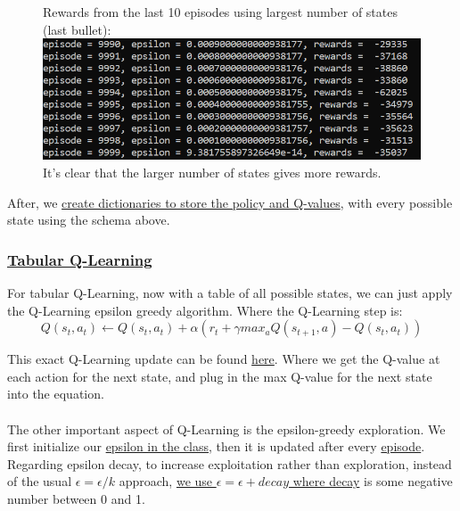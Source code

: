 \documentclass[twoside,11pt]{article}
\begin{document}
\begin{figure}[H]
Rewards from the last 10 episodes using largest number of states (last bullet):\\
\includegraphics[scale=0.5]{rewards_last_10_episodes_largest_number_states}
\centering
\\ It's clear that the larger number of states gives more rewards.
\end{figure}
After, we \href{https://github.com/duoduocai-dot/csc498-project/blob/main/tabular_Q_learning.py#L37}{create dictionaries to store the policy and Q-values}, with every possible state using the schema above.

\subsubsection{\href{https://github.com/duoduocai-dot/csc498-project/blob/main/tabular_Q_learning.py}{Tabular Q-Learning}}
For tabular Q-Learning, now with a table of all possible states, we can just apply the Q-Learning epsilon greedy algorithm. Where the Q-Learning step is:
\begin{equation}
Q(s_t,a_t) \leftarrow Q(s_t,a_t) + \alpha (r_t + \gamma max_a Q(s_{t+1},a) - Q(s_t,a_t))
\end{equation}

This exact Q-Learning update can be found \href{https://github.com/duoduocai-dot/csc498-project/blob/main/tabular_Q_learning.py#L90}{here}. Where we get the Q-value at each action for the next state, and plug in the max Q-value for the next state into the equation.
\\\\
The other important aspect of Q-Learning is the epsilon-greedy exploration. We first initialize our \href{https://github.com/duoduocai-dot/csc498-project/blob/main/tabular_Q_learning.py#L54}{epsilon in the class}, then it is updated after every \href{https://github.com/duoduocai-dot/csc498-project/blob/main/tabular_Q_learning.py#L285}{episode}. 
\\
Regarding epsilon decay, to increase exploitation rather than exploration, instead of the usual $\epsilon = \epsilon/k$ approach, \href{https://github.com/duoduocai-dot/csc498-project/blob/main/tabular_Q_learning.py#L285}{we use $\epsilon = \epsilon + decay$ where decay} is some negative number between 0 and 1.
\end{document}
